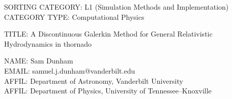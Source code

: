 \documentclass[11pt]{article}
\begin{document}

% 
% 
% 
%



SORTING CATEGORY: L1 (Simulation Methods and Implementation) \\
CATEGORY TYPE: Computational Physics

TITLE: A Discontinuous Galerkin Method for General Relativistic Hydrodynamics in thornado



NAME: Sam Dunham \\
EMAIL: samuel.j.dunham@vanderbilt.edu \\
AFFIL: Department of Astronomy, Vanderbilt University \\
AFFIL: Department of Physics, University of Tennessee--Knoxville


\end{document}
